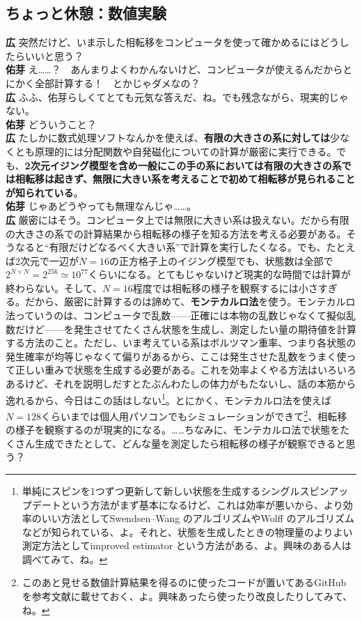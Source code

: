 \documentclass[paper=b5j,fontsize=12Q,jafontsize=12Q,baselineskip=21Q]{jlreq}
\DeclareRobustCommand{\hiron}{\textbf{広 }}
\DeclareRobustCommand{\umen}{\textbf{佑芽 }}
\begin{document}
\begin{refsection}
\subsection{ちょっと休憩：数値実験}
\hiron 突然だけど、いま示した相転移をコンピュータを使って確かめるにはどうしたらいいと思う？
\\\umen え……？　あんまりよくわかんないけど、コンピュータが使えるんだからとにかく全部計算する！　とかじゃダメなの？
\\\hiron ふふ、佑芽らしくてとても元気な答えだ、ね。でも残念ながら、現実的じゃない。
\\\umen どういうこと？
\\\hiron たしかに数式処理ソフトなんかを使えば、\textbf{有限の大きさの系に対しては}少なくとも原理的には分配関数や自発磁化についての計算が厳密に実行できる。でも、\textbf{2次元イジング模型を含め一般にこの手の系においては有限の大きさの系では相転移は起きず、無限に大きい系を考えることで初めて相転移が見られることが知られている}。
\\\umen じゃあどうやっても無理なんじゃ……。
\\\hiron 厳密にはそう。コンピュータ上では無限に大きい系は扱えない。だから有限の大きさの系での計算結果から相転移の様子を知る方法を考える必要がある。そうなると``有限だけどなるべく大きい系''で計算を実行したくなる。でも、たとえば2次元で一辺が$N=16$の正方格子上のイジング模型でも、状態数は全部で$2^{N\times N}=2^{256}\simeq10^{77}$くらいになる。とてもじゃないけど現実的な時間では計算が終わらない。そして、$N=16$程度では相転移の様子を観察するには小さすぎる。だから、厳密に計算するのは諦めて、\textbf{モンテカルロ法}を使う。モンテカルロ法っていうのは、コンピュータで乱数------正確には本物の乱数じゃなくて擬似乱数だけど------を発生させてたくさん状態を生成し、測定したい量の期待値を計算する方法のこと。ただし、いま考えている系はボルツマン重率、つまり各状態の発生確率が均等じゃなくて偏りがあるから、ここは発生させた乱数をうまく使って正しい重みで状態を生成する必要がある。これを効率よくやる方法はいろいろあるけど、それを説明しだすとたぶんわたしの体力がもたないし、話の本筋から逸れるから、今日はこの話はしない\footnote{単純にスピンを1つずつ更新して新しい状態を生成するシングルスピンアップデートという方法がまず基本になるけど、これは効率が悪いから、より効率のいい方法としてSwendsen–Wang のアルゴリズムやWolff のアルゴリズムなどが知られている、よ。それと、状態を生成したときの物理量のよりよい測定方法としてimproved estimator という方法がある、よ。興味のある人は調べてみて、ね。}。とにかく、モンテカルロ法を使えば$N=128$くらいまでは個人用パソコンでもシミュレーションができて\footnote{このあと見せる数値計算結果を得るのに使ったコードが置いてあるGitHub を参考文献に載せておく、よ。興味あったら使ったり改良したりしてみて、ね。}、相転移の様子を観察するのが現実的になる。……ちなみに、モンテカルロ法で状態をたくさん生成できたとして、どんな量を測定したら相転移の様子が観察できると思う？

\end{refsection}
\end{document}
